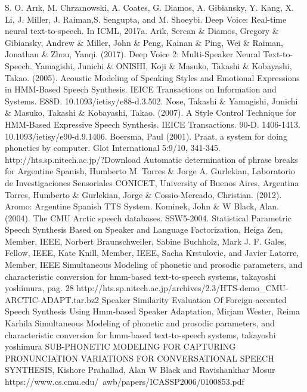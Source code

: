 \begin{thebibliography}{9}
 S. O. Arık, M. Chrzanowski, A. Coates, G. Diamos, A. Gibiansky, Y. Kang, X. Li, J. Miller, J. Raiman,S. Sengupta, and M. Shoeybi. Deep Voice: Real-time neural text-to-speech. In ICML, 2017a.
 Arik, Sercan \& Diamos, Gregory \& Gibiansky, Andrew \& Miller, John \& Peng, Kainan \& Ping, Wei \& Raiman, Jonathan \& Zhou, Yanqi. (2017). Deep Voice 2: Multi-Speaker Neural Text-to-Speech. 
 Yamagishi, Junichi \& ONISHI, Koji \& Masuko, Takashi \& Kobayashi, Takao. (2005). Acoustic Modeling of Speaking Styles and Emotional Expressions in HMM-Based Speech Synthesis. IEICE Transactions on Information and Systems. E88D. 10.1093/ietisy/e88-d.3.502. 
 Nose, Takashi \& Yamagishi, Junichi \& Masuko, Takashi \& Kobayashi, Takao. (2007). A Style Control Technique for HMM-Based Expressive Speech Synthesis. IEICE Transactions. 90-D. 1406-1413. 10.1093/ietisy/e90-d.9.1406. 
 Boersma, Paul (2001). Praat, a system for doing phonetics by computer. Glot International 5:9/10, 341-345.
 http://hts.sp.nitech.ac.jp/?Download
 Automatic determination of phrase breaks for Argentine Spanish, Humberto M. Torres \& Jorge A. Gurlekian, Laboratorio de Investigaciones Sensoriales CONICET, University of Buenos Aires, Argentina
 Torres, Humberto \& Gurlekian, Jorge \& Cossio-Mercado, Christian. (2012). Aromo: Argentine Spanish TTS System.
 Kominek, John \& W Black, Alan. (2004). The CMU Arctic speech databases. SSW5-2004.
 Statistical Parametric Speech Synthesis Based on Speaker and Language Factorization, Heiga Zen, Member, IEEE, Norbert Braunschweiler, Sabine Buchholz, Mark J. F. Gales, Fellow, IEEE, Kate Knill, Member, IEEE, Sacha Krstulovic, and Javier Latorre, Member, IEEE
 Simultaneous Modeling of phonetic and prosodic parameters, and characteristic conversion for hmm-based text-to-speech systems, takayoshi yoshimura, pag. 28
 http://hts.sp.nitech.ac.jp/archives/2.3/HTS-demo_CMU-ARCTIC-ADAPT.tar.bz2
 Speaker Similarity Evaluation Of Foreign-accented Speech Synthesis Using Hmm-based Speaker Adaptation, Mirjam Wester, Reima Karhila
 Simultaneous Modeling of phonetic and prosodic parameters, and characteristic conversion for hmm-based text-to-speech systems, takayoshi yoshimura
 SUB-PHONETIC MODELING FOR CAPTURING PRONUNCIATION VARIATIONS FOR CONVERSATIONAL SPEECH SYNTHESIS, Kishore Prahallad, Alan W Black and Ravishankhar Mosur https://www.cs.cmu.edu/~awb/papers/ICASSP2006/0100853.pdf

\end{thebibliography}
